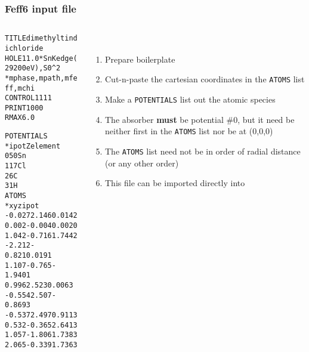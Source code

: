 \begin{frame}[fragile]
  \frametitle{Feff6 input file}
  \begin{columns}
    \begin{column}{0.45\linewidth}
\begin{alltt}
\scriptsize
 {\color{Green4}TITLE dimethyltin dichloride}
 {\color{Purple2}HOLE}      1   1.0  {\color{Blue4} *  Sn K edge (29200 eV), S0^2}
 {\color{Blue4}*         mphase,mpath,mfeff,mchi}
 {\color{SteelBlue2}CONTROL}   1      1     1     1
 {\color{SteelBlue2}PRINT}     1      0     0     0
 {\color{Purple2}RMAX}      6.0

 {\color{Brown4}POTENTIALS}
 {\color{Blue4}*    ipot   Z  element}
        0   50   Sn        
        1   17   Cl
        2    6   C
        3    1   H
 {\color{Brown4}ATOMS}
 {\color{Blue4}*   x       y       z    ipot}
   -0.027   2.146   0.014  2
    0.002  -0.004   0.002  0
    1.042  -0.716   1.744  2
   -2.212  -0.821   0.019  1
    1.107  -0.765  -1.940  1
    0.996   2.523   0.006  3
   -0.554   2.507  -0.869  3
   -0.537   2.497   0.911  3
    0.532  -0.365   2.641  3
    1.057  -1.806   1.738  3
    2.065  -0.339   1.736  3
\end{alltt}      
    \end{column}
    \begin{column}{0.55\linewidth}
      ~\\[2ex]

      \begin{enumerate}
      \item Prepare  boilerplate
      \item Cut-n-paste the cartesian coordinates in the
        {\color{Brown4}\texttt{ATOMS}} list
      \item Make a {\color{Brown4}\texttt{POTENTIALS}} list out the
        atomic species
      \item The absorber \textbf{must} be potential \#0, but it need
        be neither first in the {\color{Brown4}\texttt{ATOMS}} list
        nor be at (0,0,0)
      \item The {\color{Brown4}\texttt{ATOMS}} list need not be in
        order of radial distance (or any other order)
      \item This  file can be imported directly into
        {\artemis}
      \end{enumerate}
    \end{column}
  \end{columns}
\end{frame}
